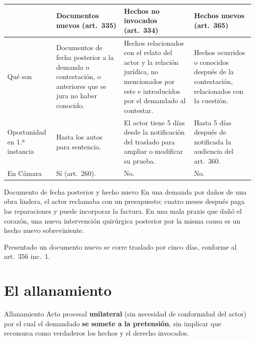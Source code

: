 \documentclass[12pt,oneside]{book}
\renewcommand{\arraystretch}{1.15}
\begin{document}
\begin{table}[H]
\centering
\renewcommand{\arraystretch}{1.25}
\begin{tabularx}{\textwidth}{>{\RaggedRight\arraybackslash}p{}>{\RaggedRight\arraybackslash}X>{\RaggedRight\arraybackslash}X>{\RaggedRight\arraybackslash}X}
\toprule
 & \textbf{Documentos nuevos (art.~335)} & \textbf{Hechos no invocados (art.~334)} & \textbf{Hechos nuevos (art.~365)} \\
\midrule
Qué son & Documentos de fecha posterior a la demanda o contestación, o anteriores que se jura no haber conocido. & Hechos relacionados con el relato del actor y la relación jurídica, no mencionados por este e introducidos por el demandado al contestar. & Hechos ocurridos o conocidos después de la contestación, relacionados con la cuestión. \\
Oportunidad en 1.ª instancia & Hasta los autos para sentencia. & El actor tiene 5 días desde la notificación del traslado para ampliar o modificar su prueba. & Hasta 5 días después de notificada la audiencia del art.~360. \\
En Cámara & Sí (art.~260). & No. & No. \\
\bottomrule
\end{tabularx}
\end{table}

\begin{example}{Documento de fecha posterior y hecho nuevo}
En una demanda por daños de una obra lindera, el actor reclamaba con un presupuesto; cuatro meses después paga las reparaciones y puede incorporar la factura. En una mala praxis que dañó el corazón, una nueva intervención quirúrgica posterior por la misma causa es un hecho nuevo sobreviniente.
\end{example}

Presentado un documento nuevo se corre traslado por cinco días, conforme al art.~356 inc.~1.

\section{El allanamiento}

\begin{definition}{Allanamiento}
Acto procesal \textbf{unilateral} (sin necesidad de conformidad del actor) por el cual el demandado \textbf{se somete a la pretensión}, sin implicar que reconozca como verdaderos los hechos y el derecho invocados.
\end{definition}
\end{document}
